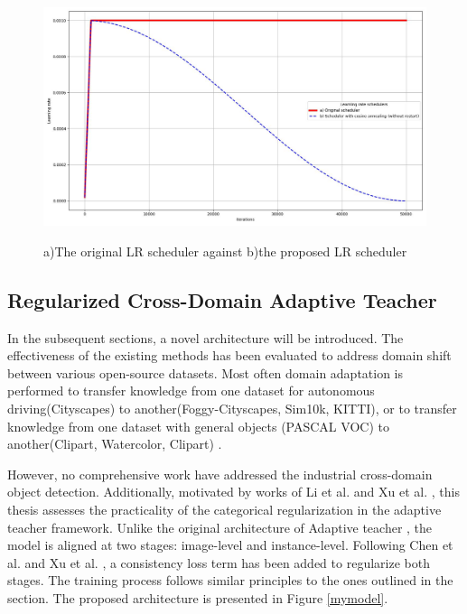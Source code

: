 \documentclass[english, 12pt, a4paper, elec, utf8, a-1b, online]{aaltothesis}
\begin{document}
\begin{figure}[htb]
	\begin{center}
		\includegraphics[width=14cm]{./LR.jpg}
	\end{center}
	\caption{a)The original LR scheduler against b)the proposed LR scheduler }
	\begin{center}
		\label{annealing}
	\end{center}
\end{figure}
\FloatBarrier

\subsection{Regularized Cross-Domain Adaptive Teacher}
\label{mainExperiments} 
In the subsequent sections, a novel architecture will be introduced. The effectiveness of the existing methods has been evaluated to address domain shift  between various open-source datasets. Most often domain adaptation is performed to transfer knowledge from one dataset for autonomous driving(Cityscapes) to another(Foggy-Cityscapes, Sim10k, KITTI), or to transfer knowledge from one dataset with general objects (PASCAL VOC) to another(Clipart, Watercolor, Clipart) \cite{Oza2021}.  

However, no comprehensive work have addressed the industrial cross-domain object detection. Additionally, motivated by works of Li et al. \cite{Li2021} and Xu et al. \cite{Xu2020}, this thesis assesses the practicality of the categorical regularization in the adaptive teacher framework. Unlike the original architecture of Adaptive teacher \cite{Li2021}, the model is aligned at two stages:  image-level and instance-level. Following Chen et al. \cite{Chen2018} and Xu et al. \cite{Xu2020}, a consistency loss term has been added to regularize both stages. The training process follows similar principles to the ones outlined in the  section. The proposed architecture is presented in Figure \ref{mymodel}. 
\end{document}
